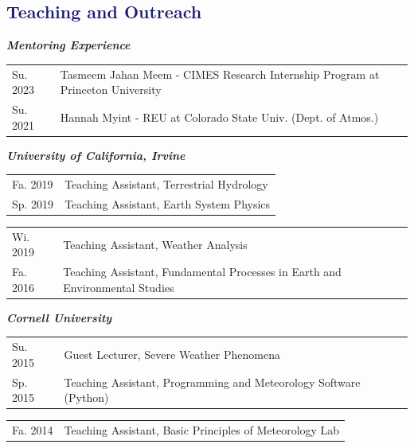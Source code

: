 \documentclass[margin,line,palatino,courier,10pt]{res}
\begin{document}
\begin{resume}
\section{\sc \textcolor{MidnightBlue}{\large{\textbf{Teaching and Outreach}}}}

\textit{\textbf{Mentoring Experience}}
\vspace*{0.05in}\\
\begin{tabular}{@{}p{0.9in}p{4in}}
Su. 2023 & Tasmeem Jahan Meem - CIMES Research Internship Program at Princeton University\\
Su. 2021 & Hannah Myint - REU at Colorado State Univ. (Dept. of Atmos.)
\end{tabular}

\textit{\textbf{University of California, Irvine}}
\vspace*{0.05in}\\
\begin{tabular}{@{}p{0.9in}p{4in}}
Fa. 2019 & Teaching Assistant, Terrestrial Hydrology\\
Sp. 2019 & Teaching Assistant, Earth System Physics\\
\end{tabular}
\begin{tabular}{@{}p{0.9in}p{4in}}
Wi. 2019 & Teaching Assistant, Weather Analysis\\
Fa. 2016 & Teaching Assistant, Fundamental Processes in Earth and Environmental Studies\\
\end{tabular}

\textit{\textbf{Cornell University}}
\vspace*{0.05in}\\
\begin{tabular}{@{}p{0.9in}p{4in}}
Su. 2015 & Guest Lecturer, Severe Weather Phenomena\\
Sp. 2015 & Teaching Assistant, Programming and Meteorology Software (Python)\\
\end{tabular}
\begin{tabular}{@{}p{0.9in}p{4in}}
Fa. 2014 & Teaching Assistant, Basic Principles of Meteorology Lab\\
\end{tabular}


\end{resume}
\end{document}
